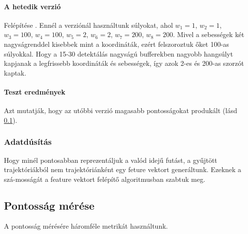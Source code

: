 \documentclass[acmtog, authorversion]{acmart}
\begin{document}
\paragraph{A hetedik verzió} Felépítése \begin{math}[x_0 * w_1, y_0 * w_2, v_{x_0} * w_3, v_{y_0} * w_4, x_l * w_5, y_l * w_6, v_{x_l} * w_7, v_{y_l} * w_8]\end{math}.
Ennél a verziónál használtunk súlyokat, ahol \begin{math}w_1=1\end{math}, \begin{math}w_2=1\end{math}, \begin{math}w_3=100\end{math}, \begin{math}w_4=100\end{math},
\begin{math}w_5=2\end{math}, \begin{math}w_6=2\end{math}, \begin{math}w_7=200\end{math}, \begin{math}w_8=200\end{math}. Mivel a sebességek két 
nagyságrenddel kisebbek mint a koordináták, ezért felszoroztuk őket 100-as súlyokkal. Hogy a 15-30 detektálás nagyságú bufferekben nagyobb hangsúlyt kapjanak a legfrissebb
koordináták és sebességek, így azok 2-es és 200-as szorzót kaptak.
\paragraph{Teszt eredmények} Azt mutatják, hogy az utóbbi verzió magasabb pontosságokat produkált (lásd \ref{}).

\subsubsection{Adatdúsítás}
Hogy minél pontosabban reprezentáljuk a valód idejű futást, a gyűjtött trajektóriákból nem trajektóriánként egy feture vektort
generáltunk. Ezeknek a szá-mosságát a feature vektort felépítő algoritmusban szabtuk meg.
\subsection{Pontosság mérése}
A pontosság mérésére háromféle metrikát használtunk.
\end{document}
